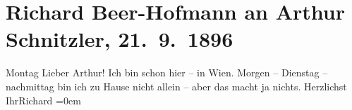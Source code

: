 

         
         \renewcommand{\erwaehntePersonen}{Personen: Richard Beer-Hofmann}
         \renewcommand{\erwaehnteOrte}{Orte: Wien}
         \renewcommand{\erwaehnteWerke}{}
               \section[Richard Beer-Hofmann an Arthur Schnitzler, 21. 9. 1896]{ Richard Beer-Hofmann an Arthur Schnitzler, 21. 9. 1896}\nopagebreak{}\rehead{ }\begin{ledgroupsized}[t]{13cm}\normalsize\beginnumbering{} \toendnotes[C]{\smallbreak\pagebreak[2]} 
\pstart
           \raggedleft{}{\pb}Montag\pend
           \pstart{}Lieber Arthur!\pend\pstart
           Ich bin schon hier – in Wien. Morgen –
                  Dienstag – nachmittag bin ich zu Hause nicht allein –
               aber das macht ja nichts.\pend
           \pstart
           Herzlichst{\\[\baselineskip]}Ihr\spacefill\mbox{Richard}\pend
           \leftskip=0em{}
         
         \endnumbering{}\end{ledgroupsized}  \newcommand{\dateiname}{L00597}\newcommand{\titel}{Richard Beer-Hofmann an Arthur Schnitzler, 21. 9. 1896}\newcommand{\editorInnen}{Martin Anton Müller und Gerd-Hermann Susen}
      